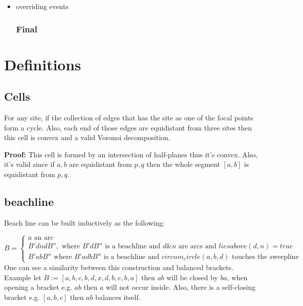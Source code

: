 \documentclass{article}
\begin{document}
\begin{enumerate}
\begin{itemize}
\begin{displayquote}
\begin{itemize}
\begin{displayquote}
\begin{itemize}
                \end{itemize}
                
              \end{displayquote}
            \end{itemize}
            \end{displayquote}
    \item overriding events 
   
   \subsubsection{{\color{black} Final}}
 
    \end{itemize}
    
\end{enumerate}

\section{Definitions}

\subsection{Cells} For any site, if the collection of edges that has the site as one of the focal points form a cycle. Also, each end of those edges are equidistant from three sites then this cell is convex and a valid Voronoi decomposition.

\textbf{Proof:}
    This cell is formed by an intersection of half-planes thus it's convex. Also, it's valid since if $a, b$ are equidistant from $p, q$ then the whole segment $[a, b]$ is equidistant  from $p, q$. %

\subsection{beachline}
Beach line can be built inductively as the following:
 
 $B =  \begin{cases}
    a \text{ an arc} \\
    B'dndB'', \text{ where } B'dB'' \text{ is a beachline and } d \& n \text{ are arcs and  } liesabove(d, n) = true \\
    B'abB'' \text{ where } B'adbB'' \text{ is a beachline and } circum_circle(a, b, d) \text{ touches the sweepline}  
  \end{cases} $
One can see a similarity between this construction and balanced brackets. %
Example let $ B := \left[a, b, c, b, d, x, d, b, e, b, a \right]$ then $ab$ will be closed by $ba$,  when opening a bracket e.g. $ab$ then $a$ will not occur inside. Also, there is a self-closing bracket e.g. $[a, b, c]$ then $ab$ balances itself.
\end{document}
